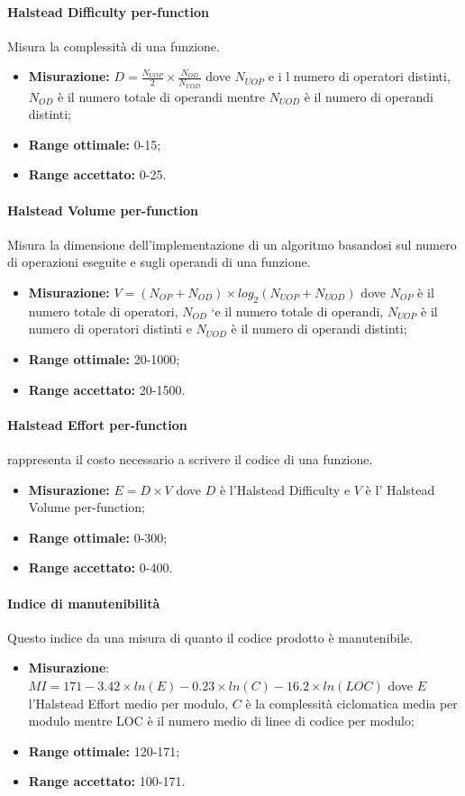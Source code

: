 			\paragraph{Halstead Difficulty per-function}
			Misura la complessità di una funzione.
			\begin{itemize}
				\item \textbf{Misurazione:} $D=\frac{N_{UOP}}{2}\times\frac{N_{OD}}{N_{UOD}}$ dove $N_{UOP}$ e i l numero di operatori distinti, $N_{OD}$ è il numero totale di operandi mentre $N_{UOD}$ è il numero di operandi distinti;
				\item \textbf{Range ottimale:} 0-15;
				\item \textbf{Range accettato:} 0-25.
			\end{itemize}
			\paragraph{Halstead Volume per-function}
			Misura la dimensione dell'implementazione di un algoritmo basandosi sul numero di operazioni eseguite e sugli operandi di una funzione.
			\begin{itemize}
				\item \textbf{Misurazione:} $V=(N_{OP} + N_{OD})\times log_2(N_{UOP} + N_{UOD})$  dove $N_{OP}$ è il numero totale di operatori, $N_{OD}$ `e il numero totale di operandi, $N_{UOP}$ è
				il numero di operatori distinti e $N_{UOD}$ è il numero di operandi distinti;
			\item \textbf{Range ottimale:} 20-1000;
			\item \textbf{Range accettato:} 20-1500.
			\end{itemize}
			\paragraph{Halstead Effort per-function}
			rappresenta il costo necessario a scrivere il codice di una funzione.
			\begin{itemize}
				\item \textbf{Misurazione:} $E=D\times V$ dove $D$ è l'Halstead Difficulty e $V$ è l' Halstead Volume per-function;
				\item \textbf{Range ottimale:} 0-300;
				\item \textbf{Range accettato:} 0-400.
			\end{itemize}
			\paragraph{Indice di manutenibilità} 
			Questo indice da una misura di quanto il codice prodotto è manutenibile.
			\begin{itemize}
				\item \textbf{Misurazione}:$MI=171-3.42\times ln(E)-0.23\times ln(C)-16.2\times ln(LOC)$ dove $E$  l'Halstead Effort medio per modulo, $C$ è la complessità ciclomatica media per modulo mentre LOC è il numero medio di linee di codice per modulo;
				\item \textbf{Range ottimale:} 120-171;
				\item \textbf{Range accettato:} 100-171.
			\end{itemize}

